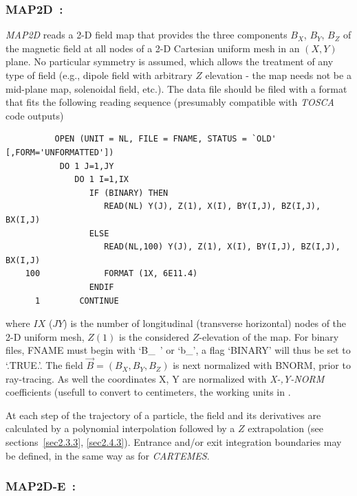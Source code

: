 \newpage

\subsubsection*{MAP2D~: \MAPTwoDTitl~\cite{Pavel}} \label{MAP2D} 
\medskip

\textsl{MAP2D} reads a 2-D field map that provides the three
components $ B_X$, $ B_Y $, $ B_Z $ of the magnetic field at all nodes of a 2-D Cartesian 
uniform mesh in an $(X,Y)$ plane. 
No particular symmetry is assumed, which allows the 
treatment of any type of field (e.g., dipole field  with arbitrary $Z$ elevation 
- the map needs not be a mid-plane map, solenoidal field, etc.). The data file should be filed with a 
format that fits the following \FORTRAN reading sequence (presumably compatible 
with \textsl{TOSCA} code outputs) 

{\footnotesize
\begin{verbatim}
	      OPEN (UNIT = NL, FILE = FNAME, STATUS = `OLD' [,FORM='UNFORMATTED'])
	       DO 1 J=1,JY 
	          DO 1 I=1,IX
	             IF (BINARY) THEN
	                READ(NL) Y(J), Z(1), X(I), BY(I,J), BZ(I,J), BX(I,J)
	             ELSE
	                READ(NL,100) Y(J), Z(1), X(I), BY(I,J), BZ(I,J), BX(I,J)
	100             FORMAT (1X, 6E11.4)
	             ENDIF
      1        CONTINUE
\end{verbatim}}
\medskip

\noindent where $IX$ ($JY$) is the number of longitudinal (transverse horizontal) nodes of 
the 2-D uniform mesh, $Z(1) $ is the considered $Z$-elevation of the map. For 
binary files, FNAME must begin with \mbox{`B\_ '} or  \mbox{`b\_'}, a flag `BINARY' will thus be 
set to `.TRUE.'. The field $ \vec  B=(B_X,B_Y,B_Z )$ is next normalized with 
BNORM, prior to ray-tracing.  As well the  coordinates  X, Y are normalized with 
  \textsl{X-,Y-NORM} coefficients (usefull to convert to centimeters, the working units in  \zgoubi. 


\bigskip

\noindent At each step of the trajectory of a particle, the field and its 
derivatives are calculated by a polynomial interpolation followed 
by a $ Z $ extrapolation (see sections~\ref{sec2.3.3}, \ref{sec2.4.3}). Entrance and/or 
exit integration boundaries may be defined, in the same way as for \textsl{CARTEMES}.


\newpage

\subsubsection*{MAP2D-E~: \MAPTwoDETitl} \label{MAP2D-E} 
\medskip

